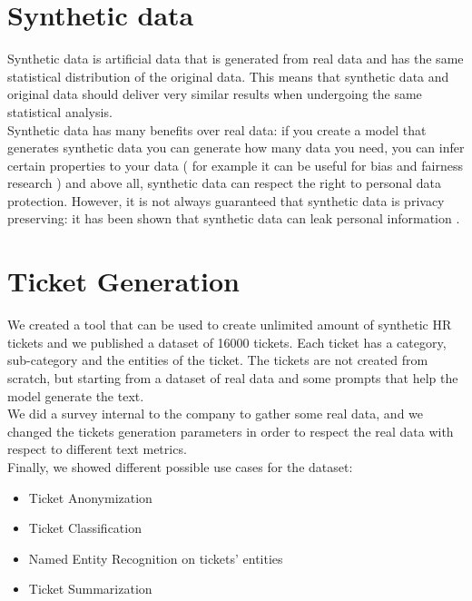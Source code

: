 \section{Synthetic data}
Synthetic data is artificial data that is generated from real data and has the same statistical distribution of the original data. This means that synthetic data and original data should deliver very similar results when undergoing the same statistical analysis. \\
Synthetic data has many benefits over real data: if you create a model that generates synthetic data you can generate how many data you need, you can infer certain properties to your data ( for example it can be useful for bias and fairness research ) and above all, synthetic data can respect the right to personal data protection. However, it is not always guaranteed that synthetic data is privacy preserving: it has been shown that synthetic data can leak personal information \cite{bellovin2019privacy}.\\

\section{Ticket Generation}
We created a tool that can be used to create unlimited amount of synthetic HR tickets and we published a dataset of 16000 tickets. Each ticket has a category, sub-category and the entities of the ticket. The tickets are not created from scratch, but starting from a dataset of real data and some prompts that help the model generate the text. \\
We did a survey internal to the company to gather some real data, and we changed the tickets generation parameters in order to respect the real data with respect to different text metrics. \\
Finally, we showed different possible use cases for the dataset:
\begin{itemize}
    \item Ticket Anonymization
    \item Ticket Classification
    \item Named Entity Recognition on tickets' entities
    \item Ticket Summarization
\end{itemize}